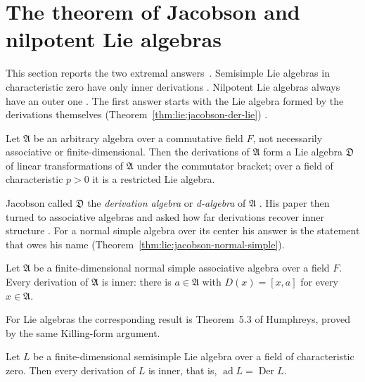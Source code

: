 \section{The theorem of Jacobson and nilpotent Lie algebras}\label{sec:lie-algebras:jacobson}

This section reports the two extremal answers~\cite[Theorem~1,
p.~207]{Jacobson1937}. Semisimple Lie algebras in
characteristic zero have only inner derivations \cite[Theorem in \S 5.3,
p.~23]{Humphreys1972}. Nilpotent Lie algebras always have an outer one
\cite[Exercise~10, p.~14]{Humphreys1972}. The first answer starts with the Lie
algebra formed by the derivations themselves
(Theorem~\ref{thm:lie:jacobson-der-lie}) \cite[Theorem~1,
p.~207]{Jacobson1937}.

\begin{theorem}\label{thm:lie:jacobson-der-lie}
Let $\mathfrak{A}$ be an arbitrary algebra over a commutative field $F$,
not necessarily associative or finite-dimensional.  Then the derivations of
$\mathfrak{A}$ form a Lie algebra $\mathfrak{D}$ of linear transformations
of $\mathfrak{A}$ under the commutator bracket; over a field of
characteristic $p>0$ it is a restricted Lie algebra.
\end{theorem}

Jacobson called $\mathfrak{D}$ the \emph{derivation algebra} or
\emph{d-algebra} of $\mathfrak{A}$ \cite[p.~207]{Jacobson1937}. His paper then
turned to associative algebras and asked how far derivations recover inner
structure \cite[pp.~209--215]{Jacobson1937}. For a normal simple algebra over
its center his answer is the statement that owes his name
(Theorem~\ref{thm:lie:jacobson-normal-simple}).

\begin{theorem}\label{thm:lie:jacobson-normal-simple}
Let $\mathfrak{A}$ be a finite-dimensional normal simple associative algebra
over a field $F$.  Every derivation of $\mathfrak{A}$ is inner: there is
$a\in\mathfrak{A}$ with $D(x)=[x,a]$ for every $x\in\mathfrak{A}$.
\end{theorem}

For Lie algebras the corresponding result is Theorem~5.3 of Humphreys,
proved by the same Killing-form argument.

\begin{theorem}\label{thm:lie:jacobson-humphreys}
Let $L$ be a finite-dimensional semisimple Lie algebra over a field of
characteristic zero.  Then every derivation of $L$ is inner, that is,
$\operatorname{ad} L=\operatorname{Der} L$.
\end{theorem}

